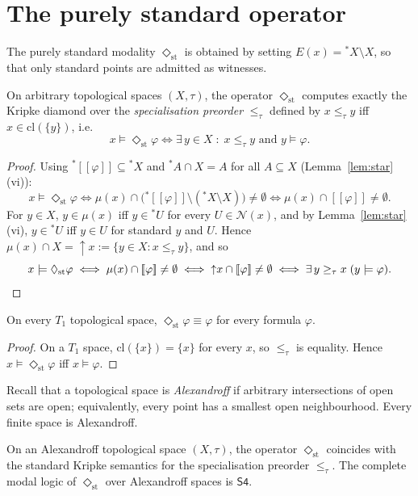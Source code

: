 \documentclass[submission,copyright,creativecommons]{eptcs}
\newcommand{\cl}{\mathrm{cl}}
\newcommand{\sem}[1]{[\![#1]\!]}
\newcommand{\diam}{\Diamond}
\newcommand{\Nbd}{\mathcal{N}}
\newcommand{\str}{{{}^{*}\!}}
\begin{document}
\section{The purely standard operator}
\label{subsec:st}

The purely standard modality $\diam_\mathrm{st}$ is obtained by setting 
$E(x) = \str X \setminus X$, so that only standard points are admitted as witnesses.
\begin{proposition}
\label{prop:stgeneral}
On arbitrary topological spaces $(X,\tau)$, the operator $\diam_\mathrm{st}$ computes exactly the Kripke diamond over the \emph{specialisation preorder} $\leq_\tau$ defined by $x \leq_\tau y$ iff $x \in \cl(\{y\})$, i.e.\
\[
  x \models \diam_\mathrm{st}\varphi
  \iff
  \exists\, y \in X\;:\; x \leq_\tau y \text{ and } y \models \varphi.
\]
\end{proposition}

\begin{proof}
Using $\str \sem{\varphi} \subseteq \str X$ and $\str A \cap X = A$ for all $A \subseteq X$ (Lemma~\ref{lem:star}(vi)):
\[
  x \models \diam_\mathrm{st}\varphi
  \iff
  \mu(x) \cap \bigl(\str \sem{\varphi} \setminus (\str X \setminus X)\bigr) \neq \emptyset
  \iff
  \mu(x) \cap \sem{\varphi} \neq \emptyset.
\]
For $y \in X$, $y \in \mu(x)$ iff $y \in \str U$ for every $U \in \Nbd(x)$, and by Lemma~\ref{lem:star}(vi), $y \in \str U$ iff $y \in U$ for standard $y$ and $U$.
Hence $\mu(x) \cap X = {\uparrow}x := \{y \in X : x \leq_\tau y\}$, and so
\[
  x \models \diam_\mathrm{st}\varphi
  \iff \mu(x) \cap \sem{\varphi} \neq \emptyset
  \iff {\uparrow}x \cap \sem{\varphi} \neq \emptyset
  \iff \exists\, y \geq_\tau x\;(y \models \varphi). \qedhere
\]
\end{proof}

\begin{corollary}
\label{cor:stdeg}
On every $T_1$ topological space, $\diam_\mathrm{st}\varphi \equiv \varphi$ for every formula $\varphi$.
\end{corollary}

\begin{proof}
On a $T_1$ space, $\cl(\{x\}) = \{x\}$ for every $x$, so $\leq_\tau$ is equality.
Hence $x\models \diam_\mathrm{st}\varphi$
 iff $x \models \varphi$.
\end{proof}
Recall that a topological space is \emph{Alexandroff} if arbitrary intersections of open sets are open; equivalently, every point has a smallest open neighbourhood.
Every finite space is Alexandroff.
\begin{corollary}
\label{cor:stalexandroff}
On an Alexandroff topological space $(X,\tau)$, the operator $\diam_\mathrm{st}$ coincides with the standard Kripke semantics for the specialisation preorder $\leq_\tau$.
The complete modal logic of $\diam_\mathrm{st}$ over  Alexandroff spaces is $\mathsf{S4}$.
\end{corollary}
\end{document}
